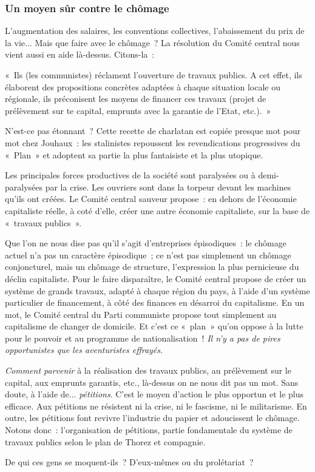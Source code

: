 \documentclass[french,twoside]{book} %
\newenvironment{quoteblock}%
  {\begin{quoting}}
  {\end{quoting}}
\newenvironment{quotebar}{%
    \def\FrameCommand{{\color{rubric!10!}\vrule width 0.5em} \hspace{0.9em}}%
    \def\OuterFrameSep{\itemsep} %
    \MakeFramed {\advance\hsize-\width \FrameRestore}
  }%
  {%
    \endMakeFramed
  }
\renewenvironment{quoteblock}%
  {%
    \savenotes
    \setstretch{0.9}
    \normalfont
    \begin{quotebar}
  }
  {%
    \end{quotebar}
    \spewnotes
  }
\begin{document}
\subsubsection[{Un moyen sûr contre le chômage}]{Un moyen sûr contre le chômage}
\noindent L’augmentation des salaires, les conventions collectives, l’abaissement du prix de la vie... Mais que faire avec le chômage ? La résolution du Comité central nous vient aussi en aide là-dessus. Citons-la :\par

\begin{quoteblock}
 \noindent « Ils (les communistes) réclament l’ouverture de travaux publics. A cet effet, ils élaborent des propositions concrètes adaptées à chaque situation locale ou régionale, ils préconisent les moyens de financer ces travaux (projet de prélèvement sur te capital, emprunts avec la garantie de l’Etat, etc.). »
 \end{quoteblock}

\noindent N’est-ce pas étonnant ? Cette recette de charlatan est copiée presque mot pour mot chez Jouhaux : les stalinistes  repoussent les revendications progressives du « Plan » et adoptent sa partie la plus fantaisiste et la plus utopique.\par
Les principales forces productives de la société sont paralysées ou à demi-paralysées par la crise. Les ouvriers sont dans la torpeur devant les machines qu’ils ont créées. Le Comité central sauveur propose : en dehors de l’économie capitaliste réelle, à coté d’elle, créer une autre économie capitaliste, sur la base de « travaux publics ».\par
Que l’on ne nous dise pas qu’il s’agit d’entreprises épisodiques : le chômage actuel n’a pas un caractère épisodique ; ce n’est pas simplement un chômage conjoncturel, mais un chômage de structure, l’expression la plus pernicieuse du déclin capitaliste. Pour le faire disparaître, le Comité central propose de créer un système de grands travaux, adapté à chaque région du pays, à l’aide d’un système particulier de financement, à côté des finances en désarroi du capitalisme. En un mot, le Comité central du Parti communiste propose tout simplement au capitalisme de changer de domicile. Et c’est ce « plan » qu’on oppose à la lutte pour le pouvoir et au programme de nationalisation ! \emph{Il n’y a pas de pires opportunistes que les aventuristes effrayés}.\par
\emph{Comment parvenir} à la réalisation des travaux publics, au prélèvement sur le capital, aux emprunts garantis, etc., là-dessus on ne nous dit pas un mot. Sans doute, à l’aide de... \emph{pétitions}. C’est le moyen d’action le plus opportun et le plus efficace. Aux pétitions ne résistent ni la crise, ni le fascisme, ni le militarisme. En outre, les pétitions font revivre l’industrie du papier et adoucissent le chômage. Notons donc : l’organisation de pétitions, partie fondamentale du système de travaux publics selon le plan de Thorez et compagnie.\par
De qui ces gens se moquent-ils ? D’eux-mêmes ou du prolétariat ?
\end{document}
